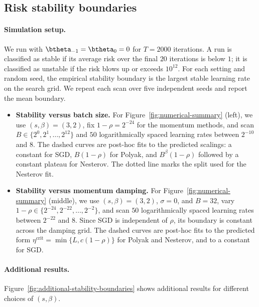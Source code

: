 \documentclass[11pt]{article}
\newcommand{\crit}{\mathrm{crit}}
\begin{document}
\subsection{Risk stability boundaries}
\label{app:stability-experiment}

\paragraph{Simulation setup.} We run with \(\btheta_{-1}=\btheta_0=0\) for \(T=2000\) iterations. A run is classified as stable if its average risk over the final \(20\) iterations is below \(1\); it is  classified as unstable if the risk blows up or exceeds \(10^{12}\). For each setting and random seed, the empirical stability boundary is the largest stable learning rate on the search grid. We repeat each scan over five independent seeds and report the mean boundary.

\begin{itemize}
\item \textbf{Stability versus batch size.} For Figure~\ref{fig:numerical-summary} (left), we use \((s,\beta)=(3,2)\), fix \(1-\rho=2^{-24}\) for the momentum methods, and scan \(B\in\{2^0,2^1,\ldots,2^{12}\}\) and \(50\) logarithmically spaced learning rates between \(2^{-10}\) and \(8\). The dashed curves are post-hoc fits to the predicted scalings: a constant for SGD, \(B(1-\rho)\) for Polyak, and \(B^\beta(1-\rho)\) followed by a constant plateau for Nesterov. The dotted line marks the split used for the Nesterov fit.



\item \textbf{Stability versus momentum damping.} For Figure~\ref{fig:numerical-summary} (middle), we use \((s,\beta)=(3,2)\), \(\sigma=0\), and \(B=32\), vary \(1-\rho\in\{2^{-24},2^{-22},\ldots,2^{-2}\}\), and scan \(50\) logarithmically spaced learning rates between \(2^{-22}\) and \(8\). Since SGD is independent of \(\rho\), its boundary is constant across the damping grid. The dashed curves are post-hoc fits to the predicted form \(\eta^\crit=\min\{L,c(1-\rho)\}\) for Polyak and Nesterov, and to a constant for SGD.
\end{itemize}

\paragraph{Additional results.} Figure~\ref{fig:additional-stability-boundaries} shows additional results for different choices of \((s,\beta)\).
\end{document}
